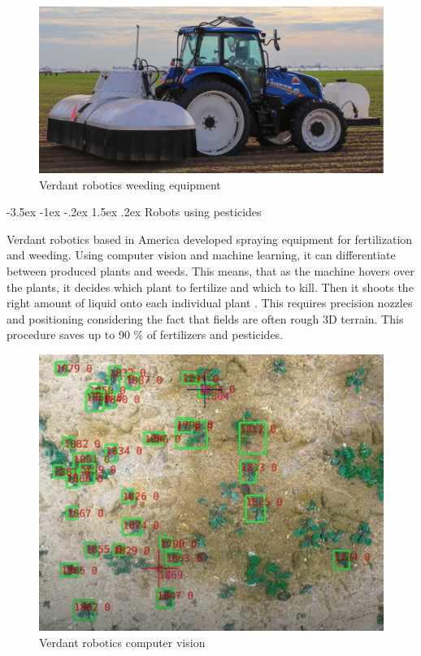 \documentclass[a4paper,10pt]{article}
\makeatletter
\theoremstyle{definition}
\renewcommand\subsection{\@startsection {subsection}{1}{\z@}%
                                   {-3.5ex \@plus -1ex \@minus -.2ex}%
                                   {1.5ex \@plus.2ex}%
                                   {\normalsize\bfseries}}
\makeatother
\begin{document}
\begin{figure}[h]
\begin{center}
\includegraphics[scale=0.5]{image/verdant_robotics.jpg}
\caption{Verdant robotics weeding equipment \cite{HBFeJBEg5CO6iD1l}}
\label{fig:2}
\end{center}
\end{figure}


\subsection{Robots using pesticides}
\label{subsec:1}

Verdant robotics based in America developed spraying equipment for fertilization and weeding. Using computer vision and machine learning, it can differentiate between produced plants and weeds. This means, that as the machine hovers over the plants, it decides which plant to fertilize and which to kill. Then it shoots the right amount of liquid onto each individual plant \cite{10.1007/978-3-319-47952-1_60}. This requires precision nozzles and positioning considering the fact that fields are often rough 3D terrain. This procedure saves up to 90 \% of fertilizers and pesticides. 

\bigskip

\begin{figure}[h!]
\begin{center}
\includegraphics[scale=0.4]{image/verdant_vision.jpg}
\caption{Verdant robotics computer vision \cite{HBFeJBEg5CO6iD1l}}
\end{center}
\end{figure}
\end{document}

